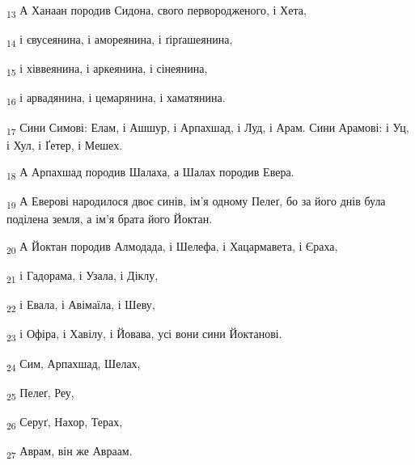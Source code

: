 \begin{tcolorbox}
\textsubscript{13} А Ханаан породив Сидона, свого первородженого, і Хета,
\end{tcolorbox}
\begin{tcolorbox}
\textsubscript{14} і євусеянина, і амореянина, і ґірґашеянина,
\end{tcolorbox}
\begin{tcolorbox}
\textsubscript{15} і хіввеянина, і аркеянина, і сінеянина,
\end{tcolorbox}
\begin{tcolorbox}
\textsubscript{16} і арвадянина, і цемарянина, і хаматянина.
\end{tcolorbox}
\begin{tcolorbox}
\textsubscript{17} Сини Симові: Елам, і Ашшур, і Арпахшад, і Луд, і Арам. Сини Арамові: і Уц, і Хул, і Ґетер, і Мешех.
\end{tcolorbox}
\begin{tcolorbox}
\textsubscript{18} А Арпахшад породив Шалаха, а Шалах породив Евера.
\end{tcolorbox}
\begin{tcolorbox}
\textsubscript{19} А Еверові народилося двоє синів, ім'я одному Пелеґ, бо за його днів була поділена земля, а ім'я брата його Йоктан.
\end{tcolorbox}
\begin{tcolorbox}
\textsubscript{20} А Йоктан породив Алмодада, і Шелефа, і Хацармавета, і Єраха,
\end{tcolorbox}
\begin{tcolorbox}
\textsubscript{21} і Гадорама, і Узала, і Діклу,
\end{tcolorbox}
\begin{tcolorbox}
\textsubscript{22} і Евала, і Авімаїла, і Шеву,
\end{tcolorbox}
\begin{tcolorbox}
\textsubscript{23} і Офіра, і Хавілу, і Йовава, усі вони сини Йоктанові.
\end{tcolorbox}
\begin{tcolorbox}
\textsubscript{24} Сим, Арпахшад, Шелах,
\end{tcolorbox}
\begin{tcolorbox}
\textsubscript{25} Пелеґ, Реу,
\end{tcolorbox}
\begin{tcolorbox}
\textsubscript{26} Серуґ, Нахор, Терах,
\end{tcolorbox}
\begin{tcolorbox}
\textsubscript{27} Аврам, він же Авраам.
\end{tcolorbox}

